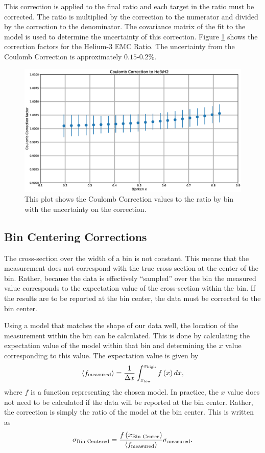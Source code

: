 This correction is applied to the final ratio and each target in the ratio must be corrected. The ratio is multiplied by the correction to the numerator and divided by the correction to the denominator. The covariance matrix of the fit to the model is used to determine the uncertainty of this correction. Figure \ref{fig:CC} shows the correction factors for the Helium-3 EMC Ratio. The uncertainty from the Coulomb Correction is approximately $0.15$-$0.2\%$.

\begin{figure}
	\includegraphics[width=\textwidth]{./analysis/fig/cc.eps}
	\caption{This plot shows the Coulomb Correction values to the  ratio by bin with the uncertainty on the correction.}
	\label{fig:CC}
\end{figure}

\subsection{Bin Centering Corrections}

The cross-section over the width of a bin is not constant. This means that the measurement does not correspond with the true cross section at the center of the bin. Rather, because the data is effectively ``sampled'' over the bin the measured value corresponds to the expectation value of the cross-section within the bin. If the results are to be reported at the bin center, the data must be corrected to the bin center.

Using a model that matches the shape of our data well, the location of the measurement within the bin can be calculated. This is done by calculating the expectation value of the model within that bin and determining the $x$ value corresponding to this value. The expectation value is given by
\begin{equation}
	\langle f_{\rm measured}\rangle = \frac{1}{\Delta x}\int_{x_{\rm low}}^{x_{\rm high}} f\left( x \right) dx,
\end{equation}
where $f$ is a function representing the chosen model. In practice, the $x$ value does not need to be calculated if the data will be reported at the bin center. Rather, the correction is simply the ratio of the model at the bin center. This is written as
\begin{equation}
	\sigma_{\textrm{Bin Centered}} = \frac{f\left(x_{\textrm{Bin Center}}\right)}{\langle f_{\rm measured}\rangle} \sigma_{\rm measured}.
\end{equation}


